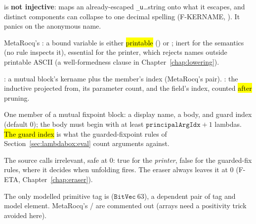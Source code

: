 \begin{remark}
  is \textbf{not injective}:  maps an already-escaped \texttt{\_u}\ldots string onto what it escapes, and distinct  components can collapse to one decimal spelling (F-KERNAME, ). It panics on the anonymous name.
\end{remark}

\begin{definition}
\label{def:BinderName}
\leanok
{} MetaRocq's : a bound variable is either \hl{printable} () or ; inert for the semantics (no rule inspects it), essential for the printer, which rejects names outside printable ASCII (a well-formedness clause in Chapter~\ref{chap:lowering}).
\end{definition}

\begin{definition}
\label{def:InductiveId}
\leanok
{}
 : a mutual block's kername plus the member's index (MetaRocq's  pair). : the inductive projected from, its parameter count, and the field's index, counted \hl{after} pruning.
\end{definition}

\begin{definition}
\label{def:FixDef}
\leanok
{}
 One member of a mutual fixpoint block: a display name, a body, and guard index  (default $0$); the body must begin with at least $\mathtt{principalArgIdx}+1$ lambdas.
 \hl{The guard index} is what the guarded-fixpoint rules of Section~\ref{sec:lambdabox:eval} count arguments against.
\end{definition}

\begin{remark}
 The source calls  irrelevant, safe at $0$: true for the \emph{printer}, false for the guarded-fix rules, where it decides when unfolding fires. The eraser always leaves it at $0$ (F-ETA, Chapter~\ref{chap:eraser}).
\end{remark}

\begin{definition}
\label{def:PrimVal}
\leanok
{} The only modelled primitive tag is  ($\mathtt{BitVec}\ 63$), a dependent pair of tag and model element. MetaRocq's / are commented out (arrays need a positivity trick avoided here).
\end{definition}

